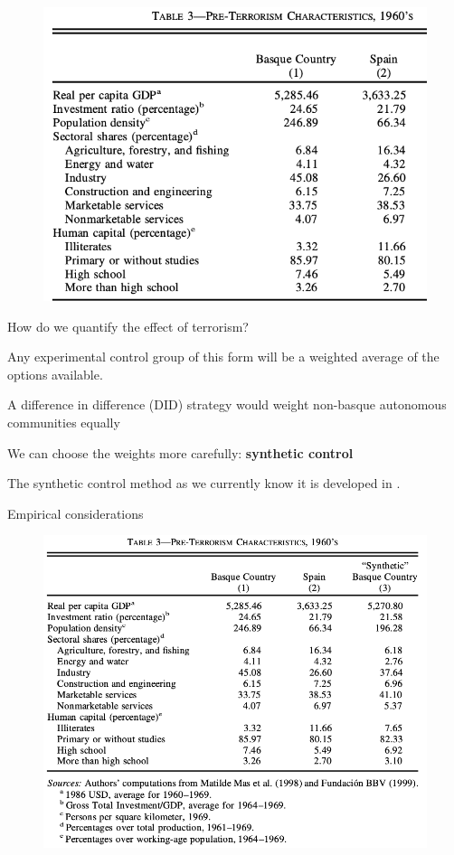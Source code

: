 \documentclass[notes,11pt, aspectratio=169]{beamer}
\newenvironment{wideitemize}{\itemize\addtolength{\itemsep}{10pt}}{\enditemize}
\begin{document}
\begin{frame}{}
    \begin{figure}
        \centering
        \includegraphics[width = .6\textwidth]{figures/balance panel.png}
        \label{fig:balance}
    \end{figure}
\end{frame}

\begin{frame}{}
    How do we quantify the effect of terrorism? \\
    \bigskip 
    
     \pause 

    \bigskip \bigskip 
    
    Any experimental control group of this form will be a weighted average of the options available. \medskip
        \begin{wideitemize}
           \item A difference in difference (DID) strategy would weight non-basque autonomous communities equally
           \item We can choose the weights more carefully: \textbf{synthetic control}
        \end{wideitemize}

    \medskip

    The synthetic control method as we currently know it is developed in 
    \cite{abadie_economic_2003}.
    
\end{frame}

\begin{frame}{Empirical considerations}
    \begin{figure}
        \centering
        \includegraphics[width = .6\textwidth]{figures/balance panel all.png}
        \label{fig:balance_all-2}
    \end{figure}
\end{frame}
\end{document}
